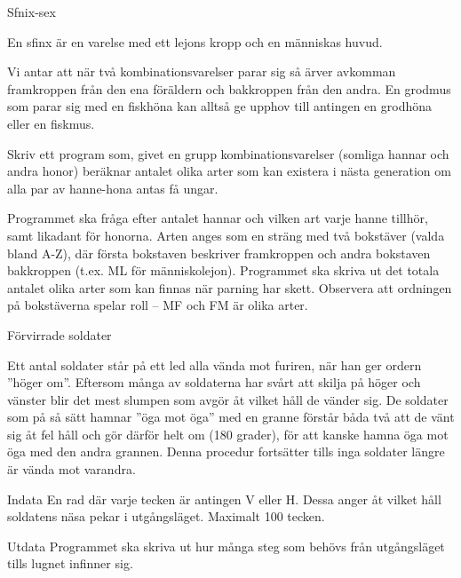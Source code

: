 \documentclass[10pt]{beamer}
\begin{document}
\begin{frame}{Sfnix-sex}

En sfinx är en varelse med ett lejons kropp och en människas huvud.

Vi antar att när två kombinationsvarelser parar sig så ärver avkomman framkroppen från den ena föräldern och bakkroppen från den andra. En grodmus som parar sig med en fiskhöna kan alltså ge upphov till antingen en grodhöna eller en fiskmus.

Skriv ett program som, givet en grupp kombinationsvarelser (somliga hannar och andra honor) beräknar antalet olika arter som kan existera i nästa generation om alla par av hanne-hona antas få ungar.

Programmet ska fråga efter antalet hannar och vilken art varje hanne tillhör, samt likadant för honorna. Arten anges som en sträng med två bokstäver (valda bland A-Z), där första bokstaven beskriver framkroppen och andra bokstaven bakkroppen (t.ex. ML för människolejon). Programmet ska skriva ut det totala antalet olika arter som kan finnas när parning har skett. Observera att ordningen på bokstäverna spelar roll – MF och FM är olika arter.

\end{frame}






\begin{frame}{Förvirrade soldater}


Ett antal soldater står på ett led alla vända mot furiren, när han ger ordern ''höger om''. Eftersom många av soldaterna har svårt att skilja på höger och vänster blir det mest slumpen som avgör åt vilket håll de vänder sig. De soldater som på så sätt hamnar ''öga mot öga'' med en granne förstår båda två att de vänt sig åt fel håll och gör därför helt om (180 grader), för att kanske hamna öga mot öga med den andra grannen. Denna procedur fortsätter tills inga soldater längre är vända mot varandra.

\begin{exampleblock}{Indata}
En rad där varje tecken är antingen V eller H. Dessa anger åt vilket håll soldatens näsa pekar i utgångsläget. Maximalt 100 tecken. 
\end{exampleblock}

\begin{exampleblock}{Utdata}
Programmet ska skriva ut hur många steg som behövs från utgångsläget tills lugnet infinner sig.
\end{exampleblock}

\end{frame}
\end{document}
